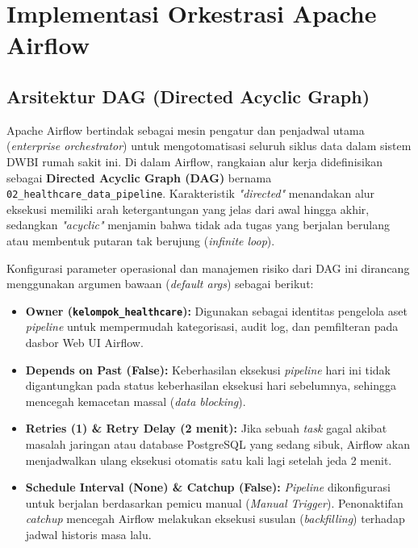 
\chapter{Implementasi Orkestrasi Apache Airflow}

 
\section{Arsitektur DAG (Directed Acyclic Graph)}
 
Apache Airflow bertindak sebagai mesin pengatur dan penjadwal utama (\textit{enterprise orchestrator}) untuk mengotomatisasi seluruh siklus data dalam sistem DWBI rumah sakit ini. Di dalam Airflow, rangkaian alur kerja didefinisikan sebagai \textbf{Directed Acyclic Graph (DAG)} bernama \texttt{02\_healthcare\_data\_pipeline}. Karakteristik \textit{"directed"} menandakan alur eksekusi memiliki arah ketergantungan yang jelas dari awal hingga akhir, sedangkan \textit{"acyclic"} menjamin bahwa tidak ada tugas yang berjalan berulang atau membentuk putaran tak berujung (\textit{infinite loop}).
 
Konfigurasi parameter operasional dan manajemen risiko dari DAG ini dirancang menggunakan argumen bawaan (\textit{default args}) sebagai berikut:
 
\begin{itemize}
    \item \textbf{Owner (\texttt{kelompok\_healthcare}):} Digunakan sebagai identitas pengelola aset \textit{pipeline} untuk mempermudah kategorisasi, audit log, dan pemfilteran pada dasbor Web UI Airflow.
    \item \textbf{Depends on Past (False):} Keberhasilan eksekusi \textit{pipeline} hari ini tidak digantungkan pada status keberhasilan eksekusi hari sebelumnya, sehingga mencegah kemacetan massal (\textit{data blocking}).
    \item \textbf{Retries (1) \& Retry Delay (2 menit):} Jika sebuah \textit{task} gagal akibat masalah jaringan atau database PostgreSQL yang sedang sibuk, Airflow akan menjadwalkan ulang eksekusi otomatis satu kali lagi setelah jeda 2 menit.
    \item \textbf{Schedule Interval (None) \& Catchup (False):} \textit{Pipeline} dikonfigurasi untuk berjalan berdasarkan pemicu manual (\textit{Manual Trigger}). Penonaktifan \textit{catchup} mencegah Airflow melakukan eksekusi susulan (\textit{backfilling}) terhadap jadwal historis masa lalu.
\end{itemize}
 
